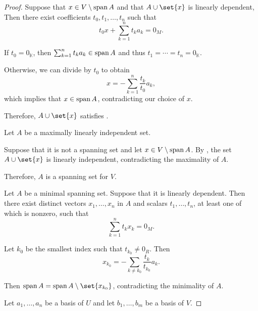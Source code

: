 \begin{proof}
   Suppose that \( x \in V \setminus \operatorname{span} A \) and that \( A \cup \set{ x } \) is linearly dependent, Then there exist coefficients \( t_0, t_1, \ldots, t_n \) such that
  \begin{equation*}
    t_0 x + \sum_{k=1}^n t_k a_k = 0_M.
  \end{equation*}

  If \( t_0 = 0_\BbbK \), then \( \sum_{k=1}^n t_k a_k \in \operatorname{span} A \) and thus \( t_1 = \cdots = t_n = 0_\BbbK \).

  Otherwise, we can divide by \( t_0 \) to obtain
  \begin{equation*}
    x = -\sum_{k=1}^n \frac {t_k} {t_0} a_k,
  \end{equation*}
  which implies that \( x \in \operatorname{span} A \), contradicting our choice of \( x \).

  Therefore, \( A \cup \set{ x } \) satisfies .

   Let \( A \) be a maximally linearly independent set.

  Suppose that it is not a spanning set and let \( x \in V \setminus \operatorname{span} A \). By , the set \( A \cup \set{ x } \) is linearly independent, contradicting the maximality of \( A \).

  Therefore, \( A \) is a spanning set for \( V \).

   Let \( A \) be a minimal spanning set. Suppose that it is linearly dependent. Then there exist distinct vectors \( x_1, \ldots, x_n \) in \( A \) and scalars \( t_1, \ldots, t_n \), at least one of which is nonzero, such that
  \begin{equation*}
    \sum_{k=1}^n t_k x_k = 0_M.
  \end{equation*}

  Let \( k_0 \) be the smallest index such that \( t_{k_0} \neq 0_R \). Then
  \begin{equation*}
    x_{k_0} = -\sum_{k \neq k_0} \frac {t_k} {t_{k_0}} a_k.
  \end{equation*}

  Then \( \linspan A = \linspan A \setminus \set{ x_{k_0} } \), contradicting the minimality of \( A \).

   Let \( a_1, \ldots, a_n \) be a basis of \( U \) and let \( b_1, \ldots, b_m \) be a basis of \( V \).


\end{proof}

